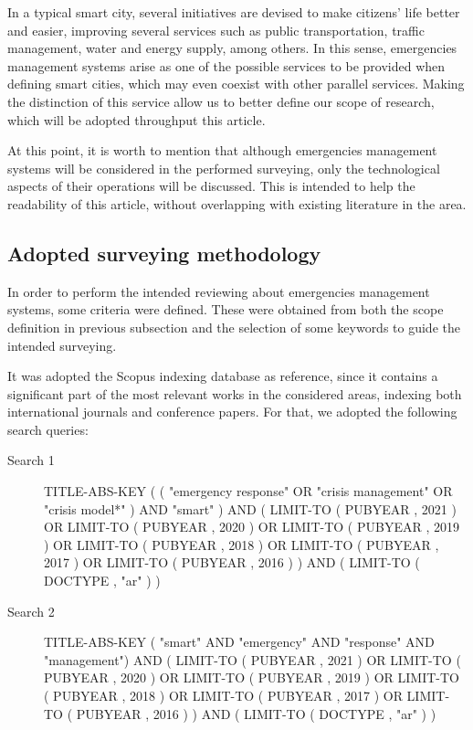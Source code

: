 \begin{refsection}
In a typical smart city, several initiatives are devised to make citizens' life better and easier, improving several services such as public transportation, traffic management, water and energy supply, among others. In this sense, emergencies management systems arise as one of the possible services to be provided when defining smart cities, which may even coexist with other parallel services. Making the distinction of this service allow us to better define our scope of research, which will be adopted throughput this article.

At this point, it is worth to mention that although emergencies management systems will be considered in the performed surveying, only the technological aspects of their operations will be discussed. This is intended to help the readability of this article, without overlapping with existing literature in the area.

\subsection{Adopted surveying methodology}

In order to perform the intended reviewing about emergencies management systems, some criteria were defined. These were obtained from both the scope definition in previous subsection and the selection of some keywords to guide the intended surveying.

It was adopted the Scopus indexing database as reference, since it contains a significant part of the most relevant works in the considered areas, indexing both international journals and conference papers. For that, we adopted the following search queries:

\begin{description}
    \item[Search 1] TITLE-ABS-KEY ( ( "emergency response"  OR  "crisis management"  OR  "crisis model*" )  AND  "smart" )  AND  ( LIMIT-TO ( PUBYEAR ,  2021 )  OR  LIMIT-TO ( PUBYEAR ,  2020 ) OR  LIMIT-TO ( PUBYEAR ,  2019 ) OR  LIMIT-TO ( PUBYEAR ,  2018 )  OR  LIMIT-TO ( PUBYEAR ,  2017 )  OR  LIMIT-TO ( PUBYEAR ,  2016 ) )  AND  ( LIMIT-TO ( DOCTYPE ,  "ar" ) )
    
    \item[Search 2] TITLE-ABS-KEY ( "smart"  AND "emergency"  AND "response"  AND "management")  AND  ( LIMIT-TO ( PUBYEAR ,  2021 )  OR  LIMIT-TO ( PUBYEAR ,  2020 ) OR  LIMIT-TO ( PUBYEAR ,  2019 ) OR  LIMIT-TO ( PUBYEAR ,  2018 )  OR  LIMIT-TO ( PUBYEAR ,  2017 )  OR  LIMIT-TO ( PUBYEAR ,  2016 ) )  AND  ( LIMIT-TO ( DOCTYPE ,  "ar" ) )
\end{description}


\end{refsection}
